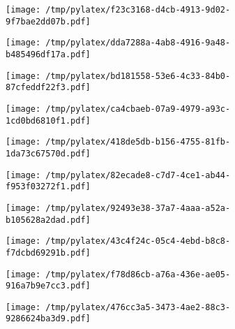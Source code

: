 \documentclass{article}
\begin{document}
\begin{figure}[htbp]
\begin{subfigure}[b]{.3\linewidth}
\texttt{[image: /tmp/pylatex/f23c3168-d4cb-4913-9d02-9f7bae2dd07b.pdf]}
\end{subfigure}
\begin{subfigure}[b]{.3\linewidth}
\texttt{[image: /tmp/pylatex/dda7288a-4ab8-4916-9a48-b485496df17a.pdf]}
\end{subfigure}
\begin{subfigure}[b]{.3\linewidth}
\texttt{[image: /tmp/pylatex/bd181558-53e6-4c33-84b0-87cfeddf22f3.pdf]}
\end{subfigure}
\begin{subfigure}[b]{.3\linewidth}
\texttt{[image: /tmp/pylatex/ca4cbaeb-07a9-4979-a93c-1cd0bd6810f1.pdf]}
\end{subfigure}
\begin{subfigure}[b]{.3\linewidth}
\texttt{[image: /tmp/pylatex/418de5db-b156-4755-81fb-1da73c67570d.pdf]}
\end{subfigure}
\begin{subfigure}[b]{.3\linewidth}
\texttt{[image: /tmp/pylatex/82ecade8-c7d7-4ce1-ab44-f953f03272f1.pdf]}
\end{subfigure}
\begin{subfigure}[b]{.3\linewidth}
\texttt{[image: /tmp/pylatex/92493e38-37a7-4aaa-a52a-b105628a2dad.pdf]}
\end{subfigure}
\begin{subfigure}[b]{.3\linewidth}
\texttt{[image: /tmp/pylatex/43c4f24c-05c4-4ebd-b8c8-f7dcbd69291b.pdf]}
\end{subfigure}
\begin{subfigure}[b]{.3\linewidth}
\texttt{[image: /tmp/pylatex/f78d86cb-a76a-436e-ae05-916a7b9e7cc3.pdf]}
\end{subfigure}
\begin{subfigure}[b]{.3\linewidth}
\texttt{[image: /tmp/pylatex/476cc3a5-3473-4ae2-88c3-9286624ba3d9.pdf]}
\end{subfigure}
\end{figure}
\end{document}
